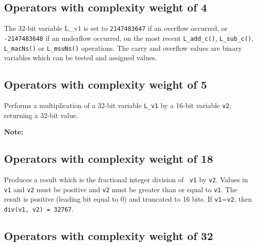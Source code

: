 \subsection{Operators with complexity weight of 4}


The 32-bit variable L\_v1 is set to {\tt 2147483647} if an overflow
occurred, or {\tt -2147483648} if an underflow occurred, on the
most recent {\tt L\_add\_c()}, {\tt L\_sub\_c()}, {\tt L\_macNs()}
or {\tt L\_msuNs()} operations. The carry and overflow values are
binary variables which can be tested and assigned values.

\enlargethispage*{10mm}

\subsection{Operators with complexity weight of 5}


Performs a multiplication of a 32-bit variable {\tt L\_v1} by a 16-bit
variable {\tt v2}, returning a 32-bit value.

\textbf{Note:} \hfill {}

\subsection{Operators with complexity weight of 18}



Produces a result which is the fractional integer division of {\tt
v1} by {\tt v2}. Values in {\tt v1} and {\tt v2} must be positive
and {\tt v2} must be greater than or equal to {\tt v1}. The result
is positive (leading bit equal to 0) and truncated to 16 bits. If
{\tt v1}={\tt v2}, then {\tt div(v1, v2) = 32767}.

\subsection{Operators with complexity weight of 32}


